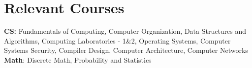 \section*{\sc Relevant Courses}
\vspace{-2mm}
\hrulefill
\vspace{.2cm}

\textbf{CS:} Fundamentals of Computing, Computer Organization, Data Structures
and Algorithms, Computing Laboratories - 1\&2, Operating
Systems, Computer Systems Security, Compiler Design, Computer Architecture, Computer Networks \\
\textbf{Math}: Discrete Math, Probability and Statistics

